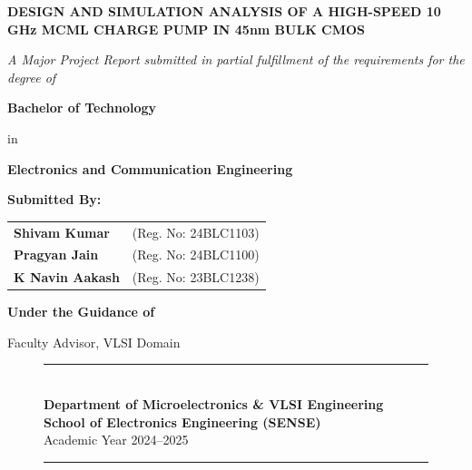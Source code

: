 \documentclass[11pt,a4paper]{report}
\begin{document}
\begin{titlepage}
    \centering
    \vspace*{0.5cm}
    
    {\Huge \bfseries \color{primaryblue} DESIGN AND SIMULATION ANALYSIS OF A HIGH-SPEED 10 GHz MCML CHARGE PUMP IN 45nm BULK CMOS \par}
    
    \vspace{1.2cm}
    {\large \textit{A Major Project Report submitted in partial fulfillment of the requirements for the degree of}\par}
    \vspace{0.4cm}
    {\Large \textbf{Bachelor of Technology} \par}
    {\large in \par}
    {\Large \textbf{Electronics and Communication Engineering} \par}
    
    \vspace{1.5cm}
    {\large \textbf{Submitted By:}\par}
    \vspace{0.4cm}
    \begin{tabular}{ll}
        \textbf{Shivam Kumar} & (Reg. No: 24BLC1103) \\
        \textbf{Pragyan Jain} & (Reg. No: 24BLC1100) \\
        \textbf{K Navin Aakash} & (Reg. No: 23BLC1238) \\
    \end{tabular}
    
    \vspace{1.8cm}
    {\large \textbf{Under the Guidance of}\par}
    \vspace{0.2cm}
    {\large Faculty Advisor, VLSI Domain\par}
    
    \vspace{1.8cm}
    \begin{figure}[H]
        \centering
        \rule{0.6\textwidth}{1pt}\\[0.3cm]
        {\large \textbf{\color{secondarynavy}Department of Microelectronics \& VLSI Engineering}}\\[0.15cm]
        {\normalsize \textbf{School of Electronics Engineering (SENSE)}}\\[0.15cm]
        {\normalsize Academic Year 2024--2025}\\[0.2cm]
        \rule{0.6\textwidth}{1pt}
    \end{figure}
    
    \vfill
\end{titlepage}
\end{document}

